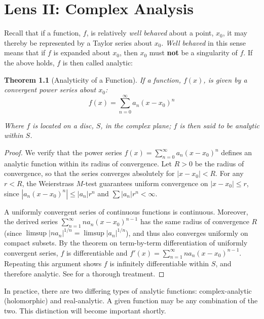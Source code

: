 \documentclass[12pt,a4paper]{report}
\theoremstyle{thms}
\newtheorem{theorem}{Theorem}[section]
\theoremstyle{defns}
\begin{document}
\chapter{Lens II: Complex Analysis}
\label{ch:complex_analysis}
Recall that if a function, $f$, is relatively \textit{well behaved} about a point, $x_0$, it may thereby be represented by a Taylor series about $x_0$. \textit{Well behaved} in this sense means that if $f$ is expanded about $x_0$, then $x_0$ must \textbf{not} be a singularity of $f$. If the above holds, $f$ is then called analytic:

\begin{theorem}[Analyticity of a Function]
    If a function, $f(x)$, is given by a convergent power series about $x_0$:
    \begin{equation}
        f(x) = \sum_{n=0}^{\infty} a_n(x-x_0)^n
    \end{equation}

    Where $f$ is located on a disc, $S$, in the complex plane; $f$ is then said to be analytic within $S$.
\end{theorem}

\begin{proof}
    We verify that the power series $f(x) = \sum_{n=0}^{\infty} a_n(x-x_0)^n$ defines an analytic function within its radius of convergence. Let $R > 0$ be the radius of convergence, so that the series converges absolutely for $|x - x_0| < R$. For any $r < R$, the Weierstrass $M$-test guarantees uniform convergence on $|x - x_0| \leq r$, since $|a_n(x-x_0)^n| \leq |a_n|r^n$ and $\sum |a_n|r^n < \infty$.

    A uniformly convergent series of continuous functions is continuous. Moreover, the derived series $\sum_{n=1}^{\infty} na_n(x-x_0)^{n-1}$ has the same radius of convergence $R$ (since $\limsup |na_n|^{1/n} = \limsup |a_n|^{1/n}$), and thus also converges uniformly on compact subsets. By the theorem on term-by-term differentiation of uniformly convergent series, $f$ is differentiable and $f'(x) = \sum_{n=1}^{\infty} na_n(x-x_0)^{n-1}$. Repeating this argument shows $f$ is infinitely differentiable within $S$, and therefore analytic. See \cite{ahlfors_complex} for a thorough treatment.
\end{proof}

In practice, there are two differing types of analytic functions: complex-analytic (holomorphic) and real-analytic. A given function may be any combination of the two. This distinction will become important shortly.
\end{document}
